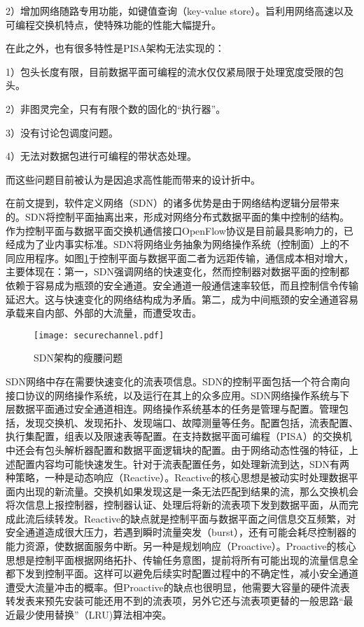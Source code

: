 2）增加网络随路专用功能，如键值查询（key-value store）。旨利用网络高速以及可编程交换机特点，使特殊功能的性能大幅提升。

在此之外，也有很多特性是PISA架构无法实现的：

1）包头长度有限，目前数据平面可编程的流水仅仅紧局限于处理宽度受限的包头。

2）非图灵完全，只有有限个数的固化的“执行器”。

3）没有讨论包调度问题。

4）无法对数据包进行可编程的带状态处理。

而这些问题目前被认为是因追求高性能而带来的设计折中。





 \label{chap24}





在前文提到，软件定义网络（SDN）的诸多优势是由于网络结构逻辑分层带来的。SDN将控制平面抽离出来，形成对网络分布式数据平面的集中控制的结构。作为控制平面与数据平面交换机通信接口OpenFlow协议是目前最具影响力的，已经成为了业内事实标准。SDN将网络业务抽象为网络操作系统（控制面）上的不同应用程序。如图\ref{fig:securechannel}于控制平面与数据平面二者为远距传输，通信成本相对增大，主要体现在：第一，SDN强调网络的快速变化，然而控制器对数据平面的控制都依赖于容易成为瓶颈的安全通道。安全通道一般通信速率较低，而且控制信令传输延迟大。这与快速变化的网络结构成为矛盾。第二，成为中间瓶颈的安全通道容易承载来自内部、外部的大流量，而遭受攻击。

\begin{figure}[!ht]
	\centering
	\texttt{[image: securechannel.pdf]}
	\caption{SDN架构的瘦腰问题} \label{fig:securechannel}
\end{figure}

SDN网络中存在需要快速变化的流表项信息。SDN的控制平面包括一个符合南向接口协议的网络操作系统，以及运行在其上的众多应用。SDN网络操作系统与下层数据平面通过安全通道相连。网络操作系统基本的任务是管理与配置。管理包括，发现交换机、发现拓扑、发现端口、故障测量等任务。配置包括，流表配置、执行集配置，组表以及限速表等配置。在支持数据平面可编程（PISA）的交换机中还会有包头解析器配置和数据平面逻辑块的配置。由于网络动态性强的特征，上述配置内容均可能快速发生。针对于流表配置任务，如处理新流到达，SDN有两种策略，一种是动态响应（Reactive）。Reactive的核心思想是被动实时处理数据平面内出现的新流量。交换机如果发现这是一条无法匹配到结果的流，那么交换机会将次信息上报控制器，控制器认证、处理后将新的流表项下发到数据平面，从而完成此流后续转发。Reactive的缺点就是控制平面与数据平面之间信息交互频繁，对安全通道造成很大压力，若遇到瞬时流量突发（burst），还有可能会耗尽控制器的能力资源，使数据面服务中断。另一种是规划响应（Proactive）。Proactive的核心思想是控制平面根据网络拓扑、传输任务意图，提前将所有可能出现的流量信息全都下发到控制平面。这样可以避免后续实时配置过程中的不确定性，减小安全通道遭受大流量冲击的概率。但Proactive的缺点也很明显，他需要大容量的硬件流表转发表来预先安装可能还用不到的流表项，另外它还与流表项更替的一般思路“最近最少使用替换”（LRU)算法相冲突。




